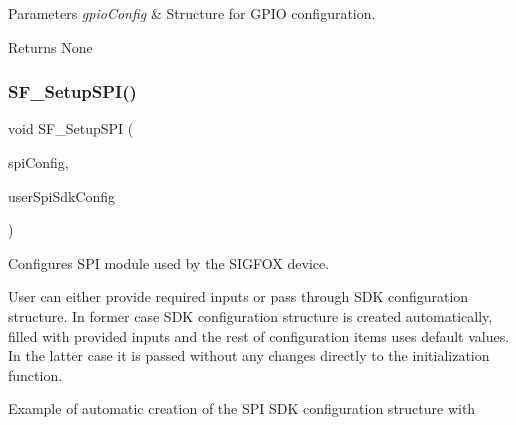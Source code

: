 \begin{DoxyParams}{Parameters}
{\em gpio\+Config} & Structure for G\+P\+IO configuration.\\
\hline
\end{DoxyParams}
\begin{DoxyReturn}{Returns}
None 
\end{DoxyReturn}
\mbox{\label{group__sf__conf__func__group_ga68177f0281489ba75661dc8517f4d547}} 
\subsubsection{\texorpdfstring{SF\_SetupSPI()}{SF\_SetupSPI()}}
{\footnotesize\ttfamily void S\+F\+\_\+\+Setup\+S\+PI (\begin{DoxyParamCaption}\item[{\mbox{\hyperlink{structsf__spi__config__t}{sf\+\_\+spi\+\_\+config\+\_\+t}} $\ast$}]{spi\+Config,  }\item[{const spi\+\_\+sdk\+\_\+master\+\_\+config\+\_\+t $\ast$}]{user\+Spi\+Sdk\+Config }\end{DoxyParamCaption})}



Configures S\+PI module used by the S\+I\+G\+F\+OX device. 

User can either provide required inputs or pass through S\+DK configuration structure. In former case S\+DK configuration structure is created automatically, filled with provided inputs and the rest of configuration items uses default values. In the latter case it is passed without any changes directly to the initialization function.

Example of automatic creation of the S\+PI S\+DK configuration structure with


